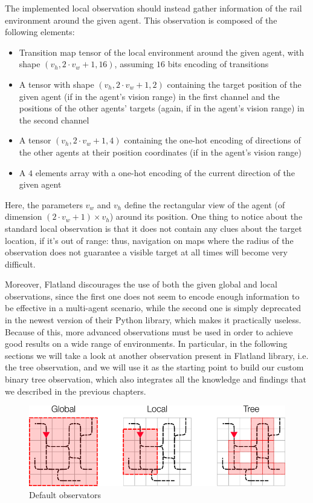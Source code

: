 \documentclass[a4paper,10pt]{report}
\begin{document}
The implemented local observation should instead gather information of the rail environment around the given agent. This observation is composed of the following elements:
\begin{itemize}
	\item Transition map tensor of the local environment around the given agent, with shape $(v_h, 2\cdot v_w +1, 16)$, assuming $16$ bits encoding of transitions
	\item A tensor with shape $(v_h, 2\cdot v_w + 1, 2)$ containing the target position of the given agent (if in the agent's vision range) in the first channel and the positions of the other agents' targets (again, if in the agent's vision range) in the second channel
	\item A tensor $(v_h,2\cdot v_w+1, 4)$ containing the one-hot encoding of directions of the other agents at their position coordinates (if in the agent's vision range)
	\item A $4$ elements array with a one-hot encoding of the current direction of the given agent
\end{itemize}
Here, the parameters $v_w$ and $v_h$ define the rectangular view of the agent (of dimension $(2\cdot v_w + 1)\times v_h$) around its position.
One thing to notice about the standard local observation is that it does not contain any clues about the target location, if it's out of range: thus, navigation on maps where the radius of the observation does not guarantee a visible target at all times will become very difficult. 

Moreover, Flatland discourages the use of both the given global and local observations, since the first one does not seem to encode enough information to be effective in a multi-agent scenario, while the second one is simply deprecated in the newest version of their Python library, which makes it practically useless. Because of this, more advanced observations must be used in order to achieve good results on a wide range of environments. In particular, in the following sections we will take a look at another observation present in Flatland library, i.e. the tree observation, and we will use it as the starting point to build our custom binary tree observation, which also integrates all the knowledge and findings that we described in the previous chapters.

\begin{figure}[h]
	\includegraphics[width=\textwidth]{default-obs.png}
	\caption{Default observators}
	\label{fig:default-obs}
\end{figure}
\end{document}
